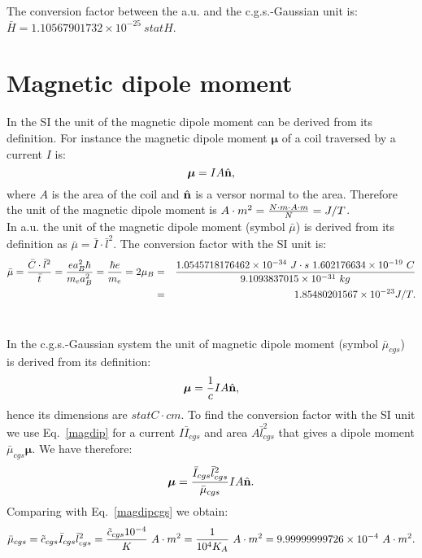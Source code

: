 \documentclass[12pt,a4paper]{article}
\def\hbarf{1.0545718176462\times 10^{-34}}
\def\e{1.602176634\times 10^{-19}}
\def\me{9.1093837015\times 10^{-31}}
\def\barmu{1.85480201567\times 10^{-23}}
\def\mutomu{9.99999999726\times 10^{-4}}
\def\barycgs{1.10567901732\times 10^{-25}}
\begin{document}
{\color{green} 
The conversion factor between the a.u. and the c.g.s.-Gaussian unit is: 
$\bar H = \barycgs\ statH$.
}

\newpage
\section{\color{coral}Magnetic dipole moment}
In the SI the unit of the magnetic dipole moment
can be derived from its definition. For instance the magnetic dipole 
moment ${\boldsymbol \mu}$ of a coil traversed by a current $I$ is:
\begin{equation}
{\boldsymbol \mu}=IA \hat {\bf n},
\label{magdip}
\end{equation}
where $A$ is the area of the coil and $\hat {\bf n}$ is a versor 
normal to the area. Therefore the unit of the magnetic dipole moment is 
$A\cdot m^2={N \cdot m \cdot  A \cdot m \over N}=J/T$.  
\\

{\color{web-blue} In a.u. the unit of the magnetic dipole moment 
(symbol $\bar \mu$) is derived from its definition as 
$\bar \mu= \bar I \cdot \bar l^2$. The conversion factor with the SI unit
is: 
\begin{eqnarray}
\bar \mu = {\bar C \cdot \bar l^2 \over \bar t}= 
{e a_B^2 \hbar \over m_e a_B^2}
= {\hbar e \over m_e}=2 \mu_B &=&
{\hbarf\ J\cdot s\ \e\ C \over \me\ kg}\nonumber \\ 
&=& \barmu J/T.
\end{eqnarray}
\\
}

{\color{orange} In the c.g.s.-Gaussian system the unit of magnetic dipole
moment (symbol $\bar \mu_{cgs}$) is derived from its definition:
\begin{equation}
{\boldsymbol \mu}={1\over c} I A \hat {\bf n},
\label{magdipcgs}
\end{equation}
hence its dimensions are 
$statC\cdot cm$. To find the conversion factor with the SI unit we use
Eq.~\ref{magdip} for a current $I \bar I_{cgs}$ and area $A \bar l_{cgs}^2$
that gives a dipole moment $\bar \mu_{cgs} {\boldsymbol \mu}$. We have
therefore:
\begin{equation}
{\boldsymbol \mu} = {\bar I_{cgs} \bar l_{cgs}^2 \over \bar \mu_{cgs} }
I A \hat {\bf n}.
\end{equation} 
Comparing with Eq.~\ref{magdipcgs} we obtain:
\begin{equation}
\bar \mu_{cgs}= \tilde c_{cgs} \bar I_{cgs} \bar l_{cgs}^2= 
{\tilde c_{cgs} 10^{-4} \over K}\ A\cdot m^2 = 
{1\over 10^4 K_A}\ A\cdot m^2 = \mutomu\ A\cdot m^2.
\end{equation}
}
\\
\end{document}
